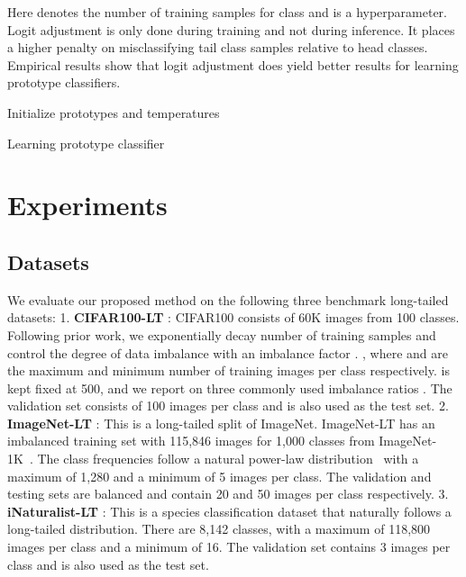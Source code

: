 \documentclass{article}
\begin{document}
Here  denotes the number of training samples for class  and  is a hyperparameter. Logit adjustment is only done during training and not during inference. It places a higher penalty on misclassifying tail class samples relative to head classes. Empirical results show that logit adjustment does yield better results for learning prototype classifiers.

\begin{algorithm}[t!]
Initialize prototypes  and temperatures \;
\caption{Learning prototype classifier}
\label{alg: algorithm1}
\end{algorithm}


\section{Experiments}
\label{Section5}
\subsection{Datasets}
We evaluate our proposed method on the following three benchmark long-tailed datasets:
1. \textbf{CIFAR100-LT} \cite{cao2019learning}: CIFAR100 consists of 60K images from 100 classes. Following prior work, we exponentially decay number of training samples and control the degree of data imbalance with an imbalance factor . , where  and  are the maximum and minimum number of training images per class respectively.  is kept fixed at 500, and we report on three commonly used imbalance ratios . The validation set consists of 100 images per class and is also used as the test set.
2. \textbf{ImageNet-LT} \cite{liu2019large}: This is a long-tailed split of ImageNet. ImageNet-LT has an imbalanced training set with 115,846 images for 1,000 classes from ImageNet-1K~\cite{deng2009imagenet}. The class frequencies follow a natural power-law distribution~\cite{van2017devil} with a maximum of 1,280 and a minimum of 5 images per class. The validation and testing sets are balanced and contain 20 and 50 images per class respectively.
3. \textbf{iNaturalist-LT} \cite{van2018inaturalist}: This is a species classification dataset that naturally follows a long-tailed distribution. There are 8,142 classes, with a maximum of 118,800 images per class and a minimum of 16. The validation set contains 3 images per class and is also used as the test set. 
\end{document}
